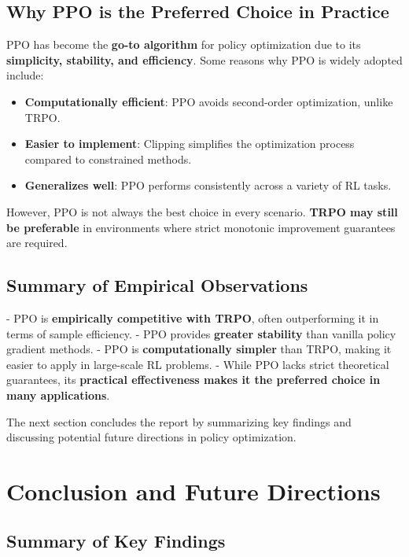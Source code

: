 \documentclass[12pt]{extreport} %
\begin{document}
\subsection{\textbf{Why PPO is the Preferred Choice in Practice}}

PPO has become the \textbf{go-to algorithm} for policy optimization due to its \textbf{simplicity, stability, and efficiency}. Some reasons why PPO is widely adopted include:

\begin{itemize}
    \item \textbf{Computationally efficient}: PPO avoids second-order optimization, unlike TRPO.
    \item \textbf{Easier to implement}: Clipping simplifies the optimization process compared to constrained methods.
    \item \textbf{Generalizes well}: PPO performs consistently across a variety of RL tasks.
\end{itemize}

However, PPO is not always the best choice in every scenario. \textbf{TRPO may still be preferable} in environments where strict monotonic improvement guarantees are required.

\subsection{\textbf{Summary of Empirical Observations}}

- PPO is \textbf{empirically competitive with TRPO}, often outperforming it in terms of sample efficiency.
- PPO provides \textbf{greater stability} than vanilla policy gradient methods.
- PPO is \textbf{computationally simpler} than TRPO, making it easier to apply in large-scale RL problems.
- While PPO lacks strict theoretical guarantees, its \textbf{practical effectiveness makes it the preferred choice in many applications}.

The next section concludes the report by summarizing key findings and discussing potential future directions in policy optimization.

\section{\textbf{Conclusion and Future Directions}}

\subsection{\textbf{Summary of Key Findings}}
\end{document}
